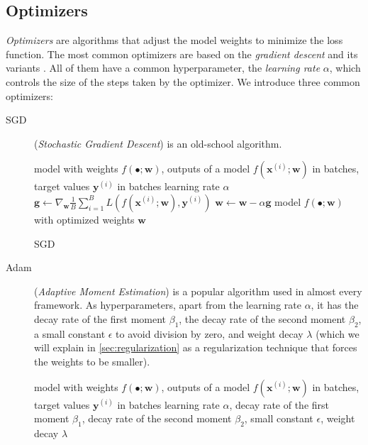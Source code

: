 \subsection{Optimizers}
\label{sec:optimizers}
\emph{Optimizers} are algorithms that adjust the model weights to minimize the loss function.
The most common optimizers are based on the \emph{gradient descent} and its variants \cite{optimization}.
All of them have a common hyperparameter, the \emph{learning rate} $\alpha$, which controls the size of the steps taken by the optimizer.
We introduce three common optimizers: 
\begin{description}
    \item[SGD] (\emph{Stochastic Gradient Descent}) \cite{deeplearningbook} is an old-school \ml algorithm.
    \begin{algorithm}
        \begin{algorithmic}
        \Require model with weights $f(\bullet;\pmb{w})$, outputs of a model $f(\pmb{x}^{(i)};\pmb{w})$ in batches, target values $\pmb{y}^{(i)}$ in batches
        \Require learning rate $\alpha$
            \State $\pmb{g} \gets \nabla_{\pmb{w}} \frac1B \sum_{i=1}^B L(f(\pmb{x}^{(i)};\pmb{w}),\pmb{y}^{(i)})$
            \State $\pmb{w} \gets \pmb{w} - \alpha \pmb{g}$
        \EndFor
        \Ensure model $f(\bullet;\pmb{w})$ with optimized weights $\pmb{w}$
        \end{algorithmic}
        \caption{SGD}
        \label{alg:sgd}
    \end{algorithm}
    \item[Adam] (\emph{Adaptive Moment Estimation}) \cite{adam} is a popular \dl algorithm used in almost every \dl framework.
    As hyperparameters, apart from the learning rate $\alpha$, it has the decay rate of the first moment $\beta_1$, the decay rate of the second moment $\beta_2$, a small constant $\epsilon$ to avoid division by zero, and weight decay $\lambda$ (which we will explain in \cref{sec:regularization} as a regularization technique that forces the weights to be smaller).
    \begin{algorithm}
        \begin{algorithmic}[1]
        \Require model with weights $f(\bullet;\pmb{w})$, outputs of a model $f(\pmb{x}^{(i)};\pmb{w})$ in batches, target values $\pmb{y}^{(i)}$ in batches
        \Require learning rate $\alpha$, decay rate of the first moment $\beta_1$, decay rate of the second moment $\beta_2$, small constant $\epsilon$, weight decay $\lambda$

\end{algorithmic}
\end{algorithm}
\end{description}
